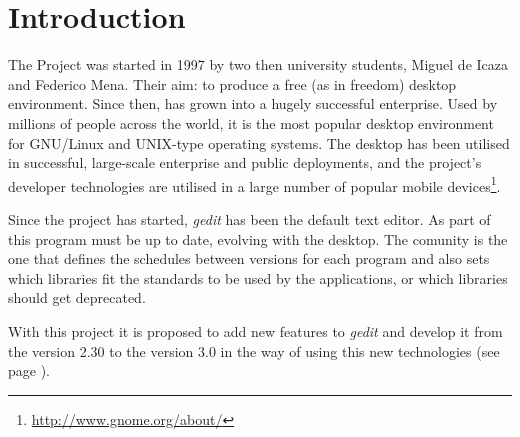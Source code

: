 
\chapter{Introduction}

The \GNOME Project was started in 1997 by two then university students, Miguel de Icaza and Federico Mena. Their aim: to produce a free (as in freedom) desktop environment. Since then, \GNOME has grown into a hugely successful enterprise. Used by millions of people across the world, it is the most popular desktop environment for GNU/Linux and UNIX-type operating systems. The desktop has been utilised in successful, large-scale enterprise and public deployments, and the project’s developer technologies are utilised in a large number of popular mobile devices\footnote{\url{http://www.gnome.org/about/}}.

Since the project has started, \emph{gedit} has been the default text editor. As part of \GNOME this program must be up to date, evolving with the desktop. The \GNOME comunity is the one that defines the schedules between versions for each program and also sets which libraries fit the standards to be used by the applications, or which libraries should get deprecated.

With this project it is proposed to add new features to \emph{gedit} and develop it from the version 2.30 to the version 3.0 in the way of using this new technologies (see page \pageref{chap:Technologies}).
